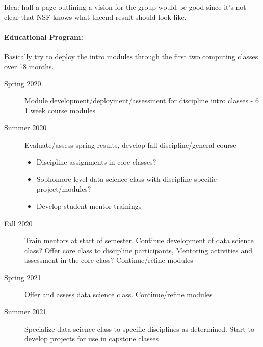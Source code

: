 %
%
Idea: half a page outlining a vision for the group would be good since it's not clear that NSF knows what theend result should look like.

\paragraph{Educational Program:}
Basically try to deploy the intro modules through the first two computing classes over 18 months.
\begin{description}
    \item[Spring 2020] Module development/deployment/assessment for discipline intro classes - 6 1 week course modules
    \item[Summer 2020] Evaluate/assess spring results, develop fall discipline/general course
    \begin{itemize}
        \item Discipline assignments in core classes?
        \item Sophomore-level data science class with discipline-specific project/modules?
        \item Develop student mentor trainings
    \end{itemize}
    \item[Fall 2020] Train mentors at start of semester. Continue development of data science class? Offer core class to discipline participants, Mentoring activities and assessment in the core class? Continue/refine modules
    \item[Spring 2021] Offer and assess data science class. Continue/refine modules
    \item[Summer 2021] Specialize data science class to specific disciplines as determined. Start to develop projects for use in capstone classes
\end{description}

